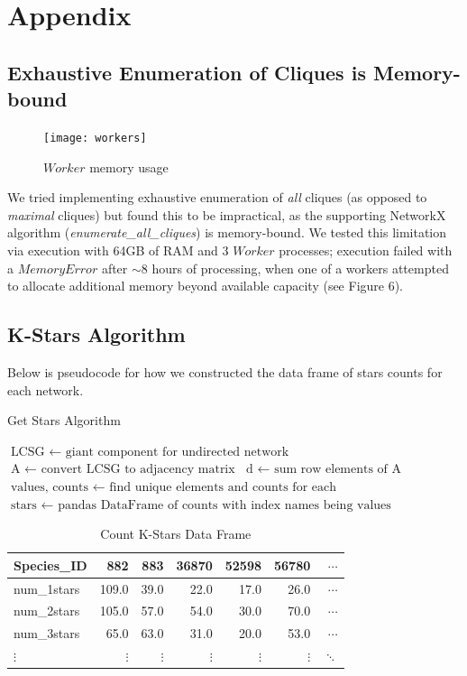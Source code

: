 \documentclass[12pt]{article}
\begin{document}
\section{Appendix}
\subsection{Exhaustive Enumeration of Cliques is Memory-bound}
\begin{figure}
  \vspace{-20pt}
  \begin{center}
    \texttt{[image: workers]}
  \end{center}
  \vspace{-20pt}
  \caption{$Worker$ memory usage}
  \vspace{-10pt}
\end{figure}
We tried implementing exhaustive enumeration of \textit{all} cliques (as opposed to \textit{maximal} cliques) but found this to be impractical, as the supporting NetworkX algorithm (\textit{enumerate\_all\_cliques}) is memory-bound. We tested this limitation via execution with 64GB of RAM and 3 $Worker$ processes; execution failed with a $MemoryError$ after $\sim8$ hours of processing, when one of a workers attempted to allocate additional memory beyond available capacity (see Figure 6).
\subsection{K-Stars Algorithm}
Below is pseudocode for how we constructed the data frame of stars counts for each network.
\begin{algorithm}
\caption{Get Stars Algorithm}\label{alg:cap}
\begin{algorithmic}
\State $\text{LCSG } \gets \text{ giant component for undirected network}$
\State $\text{A } \gets \text{ convert LCSG to adjacency matrix}$
\State $\text{d } \gets \text{ sum row elements of A}$
\State $\text{values, counts } \gets \text{ find unique elements and counts for each}$
\State $\text{stars } \gets \text{ pandas DataFrame of counts with index names being values}$
\end{algorithmic}
\end{algorithm}
\begin{table}[H]
\centering
\caption{Count K-Stars Data Frame}
\begin{tabular}{lrrrrrr}
\toprule
Species\_ID &  882   &  883   &  36870 &  52598 &  56780 & $\cdots$\\
\midrule
num\_1stars &  109.0 &   39.0 &   22.0 &   17.0 &   26.0 & $\cdots$\\
num\_2stars &  105.0 &   57.0 &   54.0 &   30.0 &   70.0 & $\cdots$\\
num\_3stars &   65.0 &   63.0 &   31.0 &   20.0 &   53.0 & $\cdots$\\
$\vdots$ &   $\vdots$ &   $\vdots$ &   $\vdots$ &    $\vdots$ &   $\vdots$ & $\ddots$\\
\bottomrule
\end{tabular}
\end{table}
\end{document}
